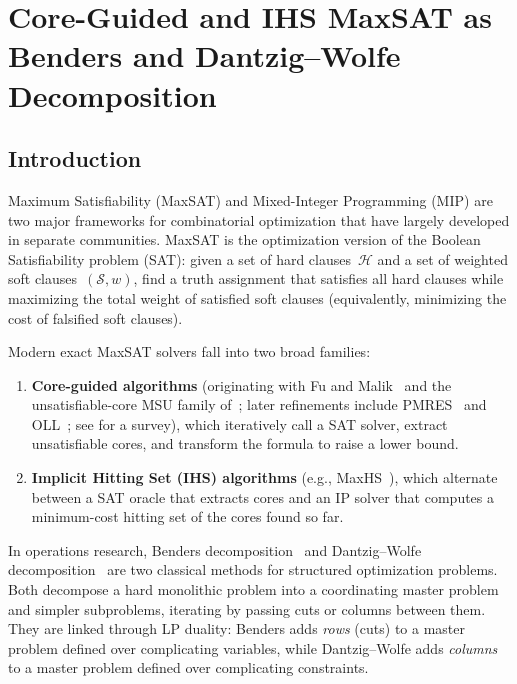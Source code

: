 \section{Core-Guided and IHS MaxSAT as Benders and Dantzig--Wolfe Decomposition}
\label{sec:part1}

\subsection{Introduction}
\label{sec:intro}

Maximum Satisfiability (MaxSAT) and Mixed-Integer Programming (MIP) are two
major frameworks for combinatorial optimization that have largely developed in
separate communities. MaxSAT is the optimization version of the Boolean
Satisfiability problem (SAT): given a set of hard clauses~$\mathcal{H}$ and a
set of weighted soft clauses~$(\mathcal{S}, w)$, find a truth assignment that
satisfies all hard clauses while maximizing the total weight of satisfied soft
clauses (equivalently, minimizing the cost of falsified soft clauses).

Modern exact MaxSAT solvers fall into two broad families:
\begin{enumerate}
\item \textbf{Core-guided algorithms} (originating with Fu and Malik~\citep{fu2006solving} and the unsatisfiable-core MSU family of~\citet{marquessilva2008algorithms}; later refinements include PMRES~\citep{narodytska2014maximum} and OLL~\citep{morgado2014core}; see \citet{morgado2013iterative} for a survey), which iteratively call a SAT solver, extract unsatisfiable cores, and transform the formula to raise a lower bound.
\item \textbf{Implicit Hitting Set (IHS) algorithms} (e.g., MaxHS~\citep{davies2011solving,davies2013exploiting}), which alternate between a SAT oracle that extracts cores and an IP solver that computes a minimum-cost hitting set of the cores found so far.
\end{enumerate}

In operations research, Benders decomposition~\citep{benders1962partitioning}
and Dantzig--Wolfe decomposition~\citep{dantzigwolfe1960} are two classical
methods for structured optimization problems. Both decompose a hard monolithic
problem into a coordinating master problem and simpler subproblems, iterating
by passing cuts or columns between them. They are linked through LP
duality: Benders adds \emph{rows} (cuts) to a master problem defined over
complicating variables, while Dantzig--Wolfe adds \emph{columns} to a master
problem defined over complicating constraints.

